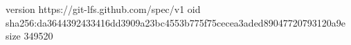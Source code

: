 version https://git-lfs.github.com/spec/v1
oid sha256:da3644392433416dd3909a23bc4553b775f75cecea3aded89047720793120a9e
size 349520
